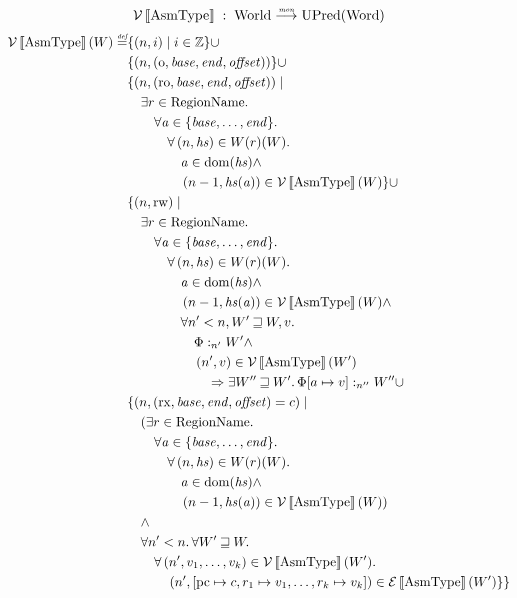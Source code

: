 \documentclass{article}
\newcommand{\update}[2]{[#1 \mapsto #2]}%
\newcommand{\sem}[1]{\left\llbracket #1 \right\rrbracket}
\newcommand{\monfun}{\stackrel{\textit{\tiny{mon}}}{\longrightarrow}}
\newcommand{\defeq}{\stackrel{\textit{\tiny{def}}}{=}}
\newcommand{\union}{\mathbin{\cup}}
\DeclareMathOperator{\dom}{dom}
\newcommand{\var}[1]{\mathit{#1}}
\newcommand{\pcreg}{\mathrm{pc}}
\newcommand{\addr}{\var{a}}
\newcommand{\offset}{\var{offset}}
\newcommand{\start}{\var{base}}
\newcommand{\addrend}{\var{end}}
\newcommand{\heapseg}{\var{hs}}
\newcommand{\perm}{\var{perm}}
\newcommand{\stdcap}[1][\perm]{\left(#1,\start,\addrend,\offset \right)}
\newcommand{\future}{\mathbin{\sqsupseteq}}
\newcommand{\heapSat}[3][\Phi]{#1 :_{#2} #3}
\newcommand{\asmType}{\plaindom{AsmType}}
\newcommand{\plaindom}[1]{\mathrm{#1}}
\newcommand{\Words}{\plaindom{Word}}
\newcommand{\ints}{\mathbb{Z}}
\newcommand{\RegionName}{\plaindom{RegionName}}
\newcommand{\Worlds}{\plaindom{World}}
\newcommand{\UPred}[1]{\plaindom{UPred}(#1)}
\newcommand{\intr}[2]{\mathcal{#1}\sem{#2}}
\newcommand{\valueintr}[1]{\intr{V}{#1}}
\newcommand{\exprintr}[1]{\intr{E}{#1}}
\newcommand{\stdvr}{\valueintr{\asmType}}
\newcommand{\stder}{\exprintr{\asmType}}
\newcommand{\npair}[2][n]{\left(#1,#2 \right)}
\newcommand{\plainperm}[1]{\mathrm{#1}}
\newcommand{\noperm}{\plainperm{o}}
\newcommand{\readonly}{\plainperm{ro}}
\newcommand{\readwrite}{\plainperm{rw}}
\newcommand{\exec}{\plainperm{rx}}
\begin{document}
\[
\stdvr \; : \;  \Worlds \monfun \UPred{\Words}
\]
\begin{align*}
  \stdvr(W) \defeq & \{ \npair{i} \mid i \in \ints \} 
\union \\
                   & \{ \npair{\stdcap[\noperm] } \} 
\union \\
                   & \{ \npair{\stdcap[\readonly]} \mid \\
                   & \quad \exists r \in \RegionName \ldotp \\
                   & \qquad  \forall \addr \in \{\start, \dots, \addrend \} \ldotp \\
                   & \qquad \quad  \forall \npair{\heapseg} \in W(r)(W)\ldotp \\
                   & \qquad \qquad   \addr \in \dom(\heapseg) \land \\
                   & \qquad \qquad   \npair[n-1]{\heapseg(\addr)} \in \stdvr(W)\} 
\union \\
                   & \{ \npair{\readwrite} \mid \\
                   & \quad \exists r \in \RegionName \ldotp \\
                   & \qquad  \forall \addr \in \{\start, \dots, \addrend \} \ldotp \\
                   & \qquad \quad  \forall \npair{\heapseg} \in W(r)(W)\ldotp \\
                   & \qquad \qquad   \addr \in \dom(\heapseg) \land \\
                   & \qquad \qquad   \npair[n-1]{\heapseg(\addr)} \in \stdvr(W) \land \\
                   & \qquad \qquad   \forall n' < n, W' \future W, v \ldotp \\
                   & \qquad \qquad \quad \heapSat{n'}{W'} \land \\
                   & \qquad \qquad \quad \npair[n']{v} \in \stdvr(W') \\
                   & \qquad \qquad \qquad  \Rightarrow \exists W'' \future W' \ldotp \heapSat[\Phi\update{a}{v}]{n''}{W''}
\union \\
                   & \{ \npair{\stdcap[\exec] = c} \mid \\
                   & \quad (\exists r \in \RegionName \ldotp \\
                   & \qquad  \forall \addr \in \{\start, \dots, \addrend \} \ldotp \\
                   & \qquad \quad  \forall \npair{\heapseg} \in W(r)(W)\ldotp \\
                   & \qquad \qquad   \addr \in \dom(\heapseg) \land \\
                   & \qquad \qquad   \npair[n-1]{\heapseg(\addr)} \in \stdvr(W)) \\
                   & \quad \land \\
                   & \quad \forall n' < n \ldotp \forall W' \future W \ldotp \\
                   & \qquad \forall \npair[n']{v_1,\dots,v_k} \in \stdvr(W') \ldotp \\
                   & \qquad \quad \npair[n']{[\pcreg \mapsto c, r_1 \mapsto v_1, \dots , r_k \mapsto v_k]} \in \stder(W') \}
\}
\end{align*}
\end{document}
